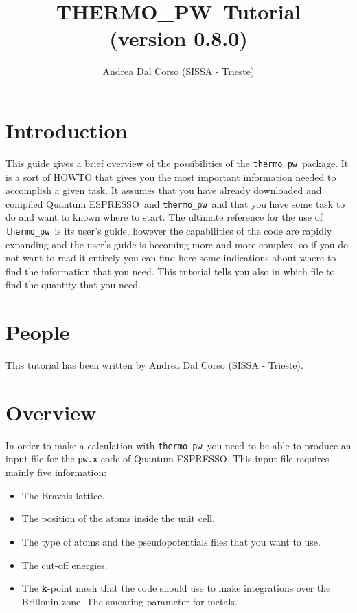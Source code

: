 \documentclass[12pt,a4paper]{article}
\def\version{0.8.0}
\def\qe{{\sc Quantum ESPRESSO}}
\def\tpw{{\sc THERMO\_PW}}
\def\thermo{\texttt{thermo\_pw}}
\begin{document}
 
\author{Andrea Dal Corso (SISSA - Trieste)}
\date{}


\title{
  \vskip 1cm
  {\color{red} \Huge \tpw\ Tutorial} \\
  \Large (version \version)
}

\maketitle

\tableofcontents

\newpage

\section{\color{coral}Introduction}

This guide gives a brief overview of the possibilities of the \thermo\ package. 
It is a sort of HOWTO that gives you the most important information needed 
to accomplish a given task.
It assumes that you have already downloaded and compiled \qe\ and \thermo\  
and that you have some task to do and want to known where to start. 
The ultimate reference for the use of \thermo\ is its user's guide,
however the capabilities of the code are rapidly expanding and the 
user's guide is becoming more and more complex, so if you do not want
to read it entirely you can find here some indications about where
to find the information that you need.
This tutorial tells you also in which file to find the quantity that you need.

\section{\color{coral}People}
This tutorial has been written by Andrea Dal Corso (SISSA - Trieste). 

\section{\color{coral}Overview}

In order to make a calculation with \thermo\ you need to be able to 
produce an input file for the \texttt{pw.x} code of \qe. This input file
requires mainly five information:
\begin{itemize}
\item The Bravais lattice.

\item The position of the atoms inside the unit cell.

\item The type of atoms and the pseudopotentials files that you want to use.

\item The cut-off energies.

\item The {\bf k}-point mesh that the code should use to make integrations over
the Brillouin zone. The smearing parameter for metals. 
\end{itemize}
\end{document}
